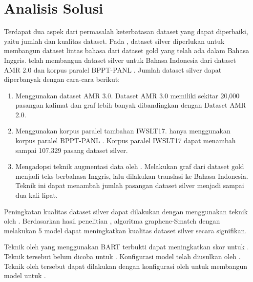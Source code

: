 \section{Analisis Solusi}

Terdapat dua aspek dari permasalah keterbatasan dataset yang dapat diperbaiki, yaitu jumlah dan kualitas dataset.
Pada \amrparsing{}, dataset silver diperlukan untuk membangun dataset lintas bahasa dari dataset gold yang telah ada dalam Bahasa Inggris.
\textcite{putra2022} telah membangun dataset silver untuk Bahasa Indonesia dari dataset AMR 2.0 dan korpus paralel BPPT-PANL .
Jumlah dataset silver dapat diperbanyak dengan cara-cara berikut:
\begin{enumerate}
  \item Menggunakan dataset AMR 3.0.
  Dataset AMR 3.0 memiliki sekitar 20,000 pasangan kalimat dan graf \AMR{} lebih banyak dibandingkan dengan Dataset AMR 2.0.

  \item Menggunakan korpus paralel tambahan IWSLT17.
  \textcite{putra2022} hanya menggunakan korpus paralel BPPT-PANL .
  Korpus paralel IWSLT17  dapat menambah sampai 107,329 pasang dataset silver.

  \item Mengadopsi teknik augmentasi data oleh \textcite{lee2022}.
  Melakukan  graf \AMR{} dari dataset gold menjadi teks berbahasa Inggris, lalu dilakukan translasi ke Bahasa Indonesia.
  Teknik ini dapat menambah jumlah pasangan dataset silver menjadi sampai dua kali lipat.
\end{enumerate}

Peningkatan kualitas dataset silver dapat dilakukan dengan menggunakan teknik  oleh \textcite{lee2022}.
Berdasarkan hasil penelitian \textcite{lee2022}, algoritma graphene-Smatch  dengan melakukan  5 model  \AMR{}  dapat meningkatkan kualitas dataset silver secara signifikan.

Teknik  oleh \textcite{bai2022} yang menggunakan  \gls{BART} terbukti dapat meningkatkan skor \SMATCH{} untuk \amrparsing{}.
Teknik tersebut belum dicoba untuk  \amrparsing{}.
Konfigurasi  model  \amrparsing{} telah diusulkan oleh \textcite{blloshmi2020}.
Teknik  oleh \textcite{bai2022} tersebut dapat dilakukan dengan konfigurasi oleh \textcite{blloshmi2020} untuk membangun model  untuk  \amrparsing{}.


